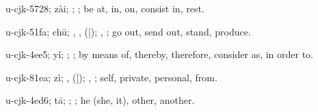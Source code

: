 \begin{multicols}{2}
{\cjkgGlue{}u-cjk-5728; zài; \cjkgGlue{}\cjkgGlue{}\cjkgGlue{}; \cjkgGlue{}; be at, in, on, consist in, rest.

\cjkgGlue{}u-cjk-51fa; chū; \cjkgGlue{}\cjkgGlue{}\cjkgGlue{}, \cjkgGlue{}\cjkgGlue{}\cjkgGlue{}, \cjkgGlue{}\cjkgGlue{}(\cjkgGlue{}|\cjkgGlue{}); \cjkgGlue{}, \cjkgGlue{}; go out, send out, stand, produce.

\cjkgGlue{}u-cjk-4ee5; yǐ; \cjkgGlue{}\cjkgGlue{}\cjkgGlue{}; \cjkgGlue{}; by means of, thereby, therefore, consider as, in order to.

\cjkgGlue{}u-cjk-81ea; zì; \cjkgGlue{}\cjkgGlue{}\cjkgGlue{}, \cjkgGlue{}\cjkgGlue{}(\cjkgGlue{}|\cjkgGlue{}); \cjkgGlue{}, \cjkgGlue{}; self, private, personal, from.

\cjkgGlue{}u-cjk-4ed6; tā; \cjkgGlue{}; \cjkgGlue{}; he (she, it), other, another.

}
\end{multicols}
